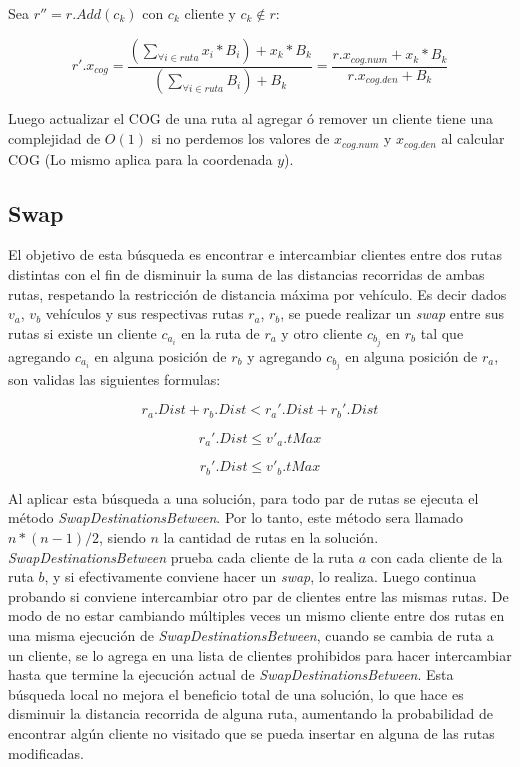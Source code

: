 \bigskip

Sea $r'' = r.Add(c_k)$ con $c_k$ cliente y $c_k \notin r$:

\begin{equation}
r'.x_{cog} =  \frac{(\sum_{\forall i \in ruta} x_i * B_i) + x_k * B_k}{(\sum_{\forall i \in ruta} B_i) + B_k}  = \frac{r.x_{cog.num}+x_k*B_k}{r.x_{cog.den}+B_k}
\end{equation}

\bigskip

Luego actualizar el COG de una ruta al agregar ó remover un cliente tiene una complejidad de $O(1)$ si no perdemos los valores de $x_{cog.num}$ y $x_{cog.den}$ al calcular COG (Lo mismo aplica para la coordenada $y$).

\bigskip


\subsection{Swap}

El objetivo de esta búsqueda es encontrar e intercambiar clientes entre dos rutas distintas con el fin de disminuir la suma de las distancias recorridas de ambas rutas, respetando la restricción de distancia máxima por vehículo. Es decir dados $v_a$, $v_b$ vehículos y sus respectivas rutas $r_a$, $r_b$, se puede realizar un \textit{swap} entre sus rutas si existe un cliente $c_{a_i}$ en la ruta de $r_a$ y otro cliente $c_{b_j}$ en $r_b$ tal que agregando $c_{a_i}$ en alguna posición de $r_b$ y agregando $c_{b_j}$ en alguna posición de $r_a$, son validas las siguientes formulas:

\begin{equation*}
r_a.Dist + r_b.Dist < r_a'.Dist + r_b'.Dist \nonumber
\end{equation*}

\begin{equation*}
r_a'.Dist \leq v'_a.tMax
\end{equation*}

\begin{equation*}
r_b'.Dist \leq v'_b.tMax
\end{equation*}

Al aplicar esta búsqueda a una solución, para todo par de rutas se ejecuta el método \textit{SwapDestinationsBetween}. Por lo tanto, este método sera llamado $n * (n-1) / 2$, siendo $n$ la cantidad de rutas en la solución. \textit{SwapDestinationsBetween} prueba cada cliente de la ruta $a$ con cada cliente de la ruta $b$, y si efectivamente conviene hacer un \textit{swap}, lo realiza. Luego continua probando si conviene intercambiar otro par de clientes entre las mismas rutas. De modo de no estar cambiando múltiples veces un mismo cliente entre dos rutas en una misma ejecución de \textit{SwapDestinationsBetween}, cuando se cambia de ruta a un cliente, se lo agrega en una lista de clientes prohibidos para hacer intercambiar hasta que termine la ejecución actual de \textit{SwapDestinationsBetween}. Esta búsqueda local no mejora el beneficio total de una solución, lo que hace es disminuir la distancia recorrida de alguna ruta, aumentando la probabilidad de encontrar algún cliente no visitado que se pueda insertar en alguna de las rutas modificadas.


